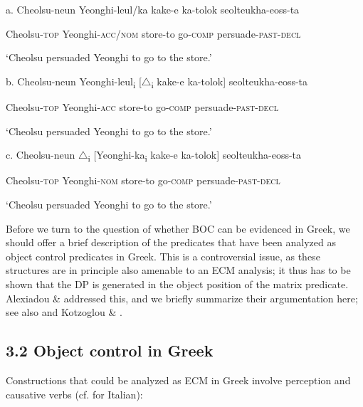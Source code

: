 \documentclass[output=paper]{langsci/langscibook}
\begin{document}
\ea%
    \label{ex:key:34}
    \gll\\
        \\
    \glt
    \z

           a.  Cheolsu-neun  Yeonghi-leul/ka     kake-e    ka-tolok   seolteukha-eoss-ta

    Cheolsu-\textsc{top}     Yeonghi-\textsc{acc/nom}   store-to  go-\textsc{comp}   persuade-\textsc{past-decl}

    ‘Cheolsu persuaded Yeonghi to go to the store.’

   b.  Cheolsu-neun Yeonghi-leul\textsubscript{i} [${\bigtriangleup}$\textsubscript{i} kake-e     ka-tolok]  seolteukha-eoss-ta

    Cheolsu-\textsc{top}    Yeonghi-\textsc{acc}          store-to   go-\textsc{comp}   persuade-\textsc{past-decl}

    ‘Cheolsu persuaded Yeonghi to go to the store.’ 

  c.  Cheolsu-neun ${\bigtriangleup}$\textsubscript{i} [Yeonghi-ka\textsubscript{i}    kake-e    ka-tolok]  seolteukha-eoss-ta

    Cheolsu-\textsc{top}         Yeonghi-\textsc{nom}    store-to  go-\textsc{comp}      persuade-\textsc{past-decl}

    ‘Cheolsu persuaded Yeonghi to go to the store.’ 

\begin{styleNurTexti}
Before we turn to the question of whether BOC can be evidenced in Greek, we should offer a brief description of the predicates that have been analyzed as object control predicates in Greek. This is a controversial issue, as these structures are in principle also amenable to an ECM analysis; it thus has to be shown that the DP is generated in the object position of the matrix predicate. Alexiadou \& \citet{Anagnostopoulou1997} addressed this, and we briefly summarize their argumentation here; see also \citet{Kotzoglou2002} and Kotzoglou \& \citet{Papangeli2007}. 
\end{styleNurTexti}

\subsection{ 3.2 Object control in Greek}

\begin{styleNurTexti}
Constructions that could be analyzed as ECM in Greek involve perception and causative verbs (cf. \citealt{Burzio1986} for Italian):
\end{styleNurTexti}
\end{document}
